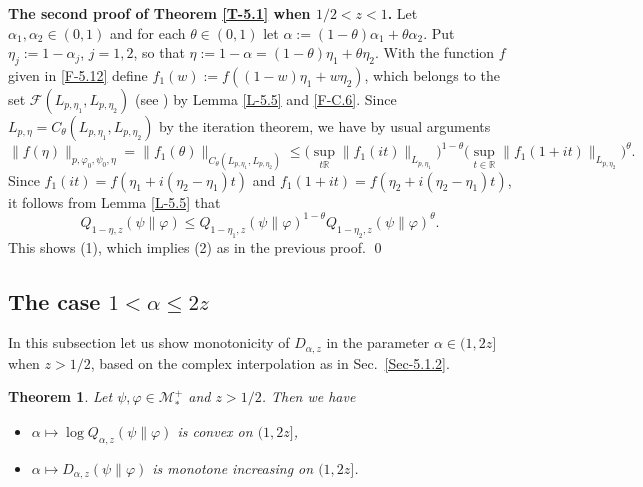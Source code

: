 \documentclass[12pt]{article}
\newtheorem{theorem}{Theorem}[section]
\theoremstyle{definition}
\theoremstyle{remark}
\numberwithin{equation}{section}
\def\Me{\mathcal M}
\def\cF{\mathcal{F}}
\def\ffi{\varphi}
\def\bR{\mathbb{R}}
\begin{document}
\noindent
{\bf The second proof of Theorem \ref{T-5.1} when $1/2<z<1$.}\enspace
Let $\alpha_1,\alpha_2\in(0,1)$ and for each $\theta\in(0,1)$ let $\alpha:=(1-\theta)\alpha_1+\theta\alpha_2$.
Put $\eta_j:=1-\alpha_j$, $j=1,2$, so that $\eta:=1-\alpha=(1-\theta)\eta_1+\theta\eta_2$. With the function
$f$ given in \eqref{F-5.12} define $f_1(w):=f((1-w)\eta_1+w\eta_2)$, which belongs to the set
$\cF(L_{p,\eta_1},L_{p,\eta_2})$ (see \cite[Definition 1.1]{kosaki1984applications}) by Lemma \ref{L-5.5}
and \eqref{F-C.6}. Since $L_{p,\eta}=C_\theta(L_{p,\eta_1},L_{p,\eta_2})$ by the iteration theorem, we have
by usual arguments
\[
\|f(\eta)\|_{p,\ffi_0,\psi_0,\eta}=\|f_1(\theta)\|_{C_\theta(L_{p,\eta_1},L_{p,\eta_2})}
\le\biggl(\sup_{t\bR}\|f_1(it)\|_{L_{p,\eta_1}}\biggr)^{1-\theta}
\biggl(\sup_{t\in\bR}\|f_1(1+it)\|_{L_{p,\eta_2}}\biggr)^\theta.
\]
Since $f_1(it)=f(\eta_1+i(\eta_2-\eta_1)t)$ and $f_1(1+it)=f(\eta_2+i(\eta_2-\eta_1)t)$, it follows from
Lemma \ref{L-5.5} that
\[
Q_{1-\eta,z}(\psi\|\ffi)\le Q_{1-\eta_1,z}(\psi\|\ffi)^{1-\theta}Q_{1-\eta_2,z}(\psi\|\ffi)^\theta.
\]
This shows (1), which implies (2) as in the previous proof.
\qed


\subsection{The case $1<\alpha\le2z$}

In this subsection let us show monotonicity of $D_{\alpha,z}$ in the parameter $\alpha\in(1,2z]$ when $z>1/2$,
based on the complex interpolation as in Sec.~\ref{Sec-5.1.2}.

\begin{theorem}
Let $\psi,\ffi\in\Me_*^+$ and $z>1/2$. Then we have
\begin{itemize}
\item[(1)] $\alpha\mapsto\log Q_{\alpha,z}(\psi\|\ffi)$ is convex on $(1,2z]$,
\item[(2)] $\alpha\mapsto D_{\alpha,z}(\psi\|\ffi)$ is monotone increasing on $(1,2z]$.
\end{itemize}
\end{theorem}
\end{document}
